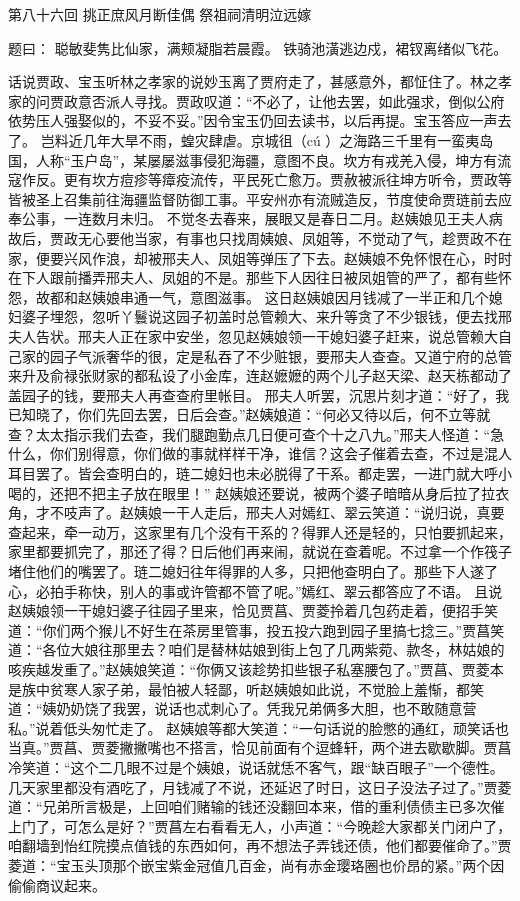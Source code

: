\documentclass[12pt,oneside]{book}
\begin{document}
第八十六回 挑正庶风月断佳偶 祭祖祠清明泣远嫁

题曰： 
聪敏斐隽比仙家，满颊凝脂若晨霞。
铁骑池潢逃边戍，裙钗离绪似飞花。

话说贾政、宝玉听林之孝家的说妙玉离了贾府走了，甚感意外，都怔住了。林之孝家的问贾政意否派人寻找。贾政叹道：“不必了，让他去罢，如此强求，倒似公府依势压人强娶似的，不妥不妥。”因令宝玉仍回去读书，以后再提。宝玉答应一声去了。
岂料近几年大旱不雨，蝗灾肆虐。京城徂（cú ）之海路三千里有一蛮夷岛国，人称“玉户岛”，某屡屡滋事侵犯海疆，意图不良。坎方有戎羌入侵，坤方有流寇作反。更有坎方痘疹等瘴疫流传，平民死亡愈万。贾赦被派往坤方听令，贾政等皆被圣上召集前往海疆监督防御工事。平安州亦有流贼造反，节度使命贾琏前去应奉公事，一连数月未归。
不觉冬去春来，展眼又是春日二月。赵姨娘见王夫人病故后，贾政无心要他当家，有事也只找周姨娘、凤姐等，不觉动了气，趁贾政不在家，便要兴风作浪，却被邢夫人、凤姐等弹压了下去。赵姨娘不免怀恨在心，时时在下人跟前播弄邢夫人、凤姐的不是。那些下人因往日被凤姐管的严了，都有些怀怨，故都和赵姨娘串通一气，意图滋事。
这日赵姨娘因月钱减了一半正和几个媳妇婆子埋怨，忽听丫鬟说这园子初盖时总管赖大、来升等贪了不少银钱，便去找邢夫人告状。邢夫人正在家中安坐，忽见赵姨娘领一干媳妇婆子赶来，说总管赖大自己家的园子气派奢华的很，定是私吞了不少赃银，要邢夫人查查。又道宁府的总管来升及俞禄张财家的都私设了小金库，连赵嬷嬷的两个儿子赵天梁、赵天栋都动了盖园子的钱，要邢夫人再查查府里帐目。
邢夫人听罢，沉思片刻才道：“好了，我已知晓了，你们先回去罢，日后会查。”赵姨娘道：“何必又待以后，何不立等就查？太太指示我们去查，我们腿跑勤点几日便可查个十之八九。”邢夫人怪道：“急什么，你们别得意，你们做的事就样样干净，谁信？这会子催着去查，不过是混人耳目罢了。皆会查明白的，琏二媳妇也未必脱得了干系。都走罢，一进门就大呼小喝的，还把不把主子放在眼里！”
赵姨娘还要说，被两个婆子暗暗从身后拉了拉衣角，才不吱声了。赵姨娘一干人走后，邢夫人对嫣红、翠云笑道：“说归说，真要查起来，牵一动万，这家里有几个没有干系的？得罪人还是轻的，只怕要抓起来，家里都要抓完了，那还了得？日后他们再来闹，就说在查着呢。不过拿一个作筏子堵住他们的嘴罢了。琏二媳妇往年得罪的人多，只把他查明白了。那些下人遂了心，必拍手称快，别人的事或许管都不管了呢。”嫣红、翠云都答应了不语。
且说赵姨娘领一干媳妇婆子往园子里来，恰见贾菖、贾菱拎着几包药走着，便招手笑道：“你们两个猴儿不好生在茶房里管事，投五投六跑到园子里搞七捻三。”贾菖笑道：“各位大娘往那里去？咱们是替林姑娘到街上包了几两紫菀、款冬，林姑娘的咳疾越发重了。”赵姨娘笑道：“你俩又该趁势扣些银子私塞腰包了。”贾菖、贾菱本是族中贫寒人家子弟，最怕被人轻鄙，听赵姨娘如此说，不觉脸上羞惭，都笑道：“姨奶奶饶了我罢，说话也忒刺心了。凭我兄弟俩多大胆，也不敢随意营私。”说着低头匆忙走了。
赵姨娘等都大笑道：“一句话说的脸憋的通红，顽笑话也当真。”贾菖、贾菱撇撇嘴也不搭言，恰见前面有个逗蜂轩，两个进去歇歇脚。贾菖冷笑道：“这个二几眼不过是个姨娘，说话就恁不客气，跟“缺百眼子”一个德性。几天家里都没有酒吃了，月钱减了不说，还延迟了时日，这日子没法子过了。”贾菱道：“兄弟所言极是，上回咱们赌输的钱还没翻回本来，借的重利债债主已多次催上门了，可怎么是好？”贾菖左右看看无人，小声道：“今晚趁大家都关门闭户了，咱翻墙到怡红院摸点值钱的东西如何，再不想法子弄钱还债，他们都要催命了。”贾菱道：“宝玉头顶那个嵌宝紫金冠值几百金，尚有赤金璎珞圈也价昂的紧。”两个因偷偷商议起来。
\end{document}
